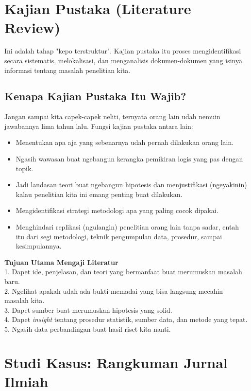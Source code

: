 \documentclass[12pt,a4paper]{article}
\begin{document}
\newpage
\section{Kajian Pustaka (Literature Review)}

Ini adalah tahap "kepo terstruktur". Kajian pustaka itu proses mengidentifikasi secara sistematis, melokalisasi, dan menganalisis dokumen-dokumen yang isinya informasi tentang masalah penelitian kita. 

\subsection{Kenapa Kajian Pustaka Itu Wajib?}
Jangan sampai kita capek-capek neliti, ternyata orang lain udah nemuin jawabannya lima tahun lalu. Fungsi kajian pustaka antara lain:
\begin{itemize}
    \item Menentukan apa aja yang sebenarnya udah pernah dilakukan orang lain.
    \item Ngasih wawasan buat ngebangun kerangka pemikiran logis yang pas dengan topik.
    \item Jadi landasan teori buat ngebangun hipotesis dan menjustifikasi (ngeyakinin) kalau penelitian kita ini emang penting buat dilakukan.
    \item Mengidentifikasi strategi metodologi apa yang paling cocok dipakai.
    \item Menghindari replikasi (ngulangin) penelitian orang lain tanpa sadar, entah itu dari segi metodologi, teknik pengumpulan data, prosedur, sampai kesimpulannya.
\end{itemize}

\begin{tipbox}
\textbf{Tujuan Utama Mengaji Literatur}\\
1. Dapet ide, penjelasan, dan teori yang bermanfaat buat merumuskan masalah baru. \\
2. Ngelihat apakah udah ada bukti memadai yang bisa langsung mecahin masalah kita. \\
3. Dapet sumber buat merumuskan hipotesis yang solid. \\
4. Dapet \textit{insight} tentang prosedur statistik, sumber data, dan metode yang tepat. \\
5. Ngasih data perbandingan buat hasil riset kita nanti.
\end{tipbox}

\newpage
\section{Studi Kasus: Rangkuman Jurnal Ilmiah}
\end{document}
